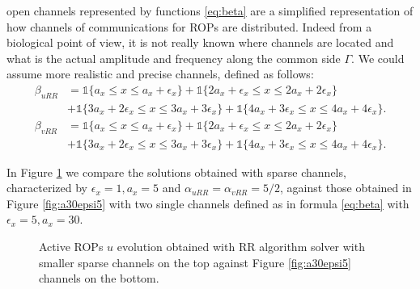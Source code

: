 open channels represented by functions \eqref{eq:beta} are a simplified representation of how channels of communications for ROPs are distributed. Indeed from a biological point of view, it is not really known where channels are located and what is the actual amplitude and frequency along the common side $\Gamma$. We could assume more realistic and precise channels, defined as follows:
\begin{equation}\begin{aligned}
    \beta_{uRR} & = \mathbb{1} \Big\{ a_x \leq x \leq a_x + \epsilon_x \Big\} + \mathbb{1} \Big\{ 2a_x +\epsilon_x \leq x \leq 2a_x + 2\epsilon_x \Big\}  \\
    & + \mathbb{1} \Big\{ 3a_x +2\epsilon_x \leq x \leq 3a_x + 3\epsilon_x \Big\} + \mathbb{1} \Big\{ 4a_x +3\epsilon_x \leq x \leq 4a_x + 4\epsilon_x \Big\}. \\
    \beta_{vRR} & = \mathbb{1} \Big\{ a_x \leq x \leq a_x + \epsilon_x \Big\} + \mathbb{1} \Big\{ 2a_x +\epsilon_x \leq x \leq 2a_x + 2\epsilon_x \Big\}  \\
    & + \mathbb{1} \Big\{ 3a_x +2\epsilon_x \leq x \leq 3a_x + 3\epsilon_x \Big\} + \mathbb{1} \Big\{ 4a_x +3\epsilon_x \leq x \leq 4a_x + 4\epsilon_x \Big\}.
\end{aligned}\end{equation}

In Figure \ref{fig:multich} we compare the solutions obtained with sparse channels, characterized by $\epsilon_x = 1, a_x = 5$ and $\alpha_{uRR} = \alpha_{vRR} = 5/2$, against those obtained in Figure \ref{fig:a30epsi5} with two single channels defined as in formula \eqref{eq:beta} with $\epsilon_x = 5, a_x = 30$.
\begin{figure}[H]
    \centering
    \quad
    \quad
    \quad
    \quad
    \quad
    \quad
    \quad
    \caption[Tuning channel prm - Smaller sparse channels]{Active ROPs $u$ evolution obtained with RR algorithm solver with smaller sparse channels on the top against Figure \ref{fig:a30epsi5} channels on the bottom.}
    \label{fig:multich}
\end{figure}

